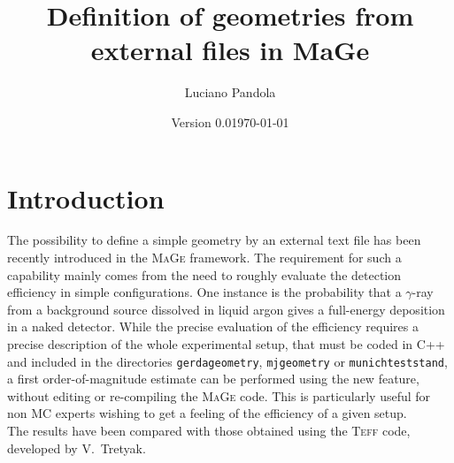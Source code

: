 \documentclass[a4paper,12pt,twoside]{article}
\begin{document}
\thispagestyle{empty}
\title{\bf Definition of geometries from external files in MaGe}
\author{Luciano Pandola}
\date{Version 0.0}
\date{\today}
\maketitle

\newcommand{\mage}{\textsc{MaGe} }

\section{Introduction}
The possibility to define a simple geometry by an external text file has 
been recently introduced in the \mage framework. The requirement for 
such a capability mainly comes from the need to roughly evaluate the 
detection efficiency in simple configurations. One instance is the probability 
that a $\gamma$-ray from a background source dissolved in liquid 
argon gives a full-energy deposition in a naked detector. While the 
precise evaluation of the efficiency requires a precise description of the 
whole experimental setup, that must be coded in \textsc{C++} and included 
in the directories \texttt{gerdageometry}, \texttt{mjgeometry} or 
\texttt{munichteststand}, a first order-of-magnitude estimate can be performed 
using the new feature, without editing or re-compiling the \mage code. 
This is particularly useful for non MC experts wishing to get a feeling of 
the efficiency of a given setup. \\
The results have been compared with those obtained using the \textsc{Teff} 
code, developed by V.~Tretyak. 
%
\end{document}
